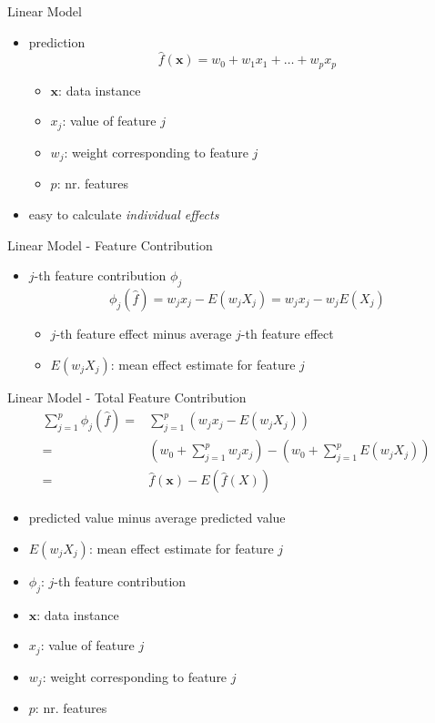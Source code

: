 \begin{frame}{Linear Model}
	\begin{itemize}
		\item prediction
		\begin{equation}
			\hat{f}(\bm{x})=w_0+w_1 x_{1} + \dots + w_p x_ p
		\end{equation}
		\begin{itemize}
			\item $\bm{x}$: data instance
			\item $x_j$: value of feature $j$
			\item $w_j$: weight corresponding to feature $j$
			\item $p$: nr. features
		\end{itemize}
		\item easy to calculate \emph{individual effects}
	\end{itemize}
\end{frame}
\begin{frame}{Linear Model - Feature Contribution}
	\begin{itemize}
		\item $j$-th feature contribution $\phi_j$
		\begin{equation}
			\phi_j(\hat{f})=w_{j}x_j-E(w_{j}X_{j})=w_{j}x_j-w_{j}E(X_{j})
		\end{equation}
		\begin{itemize}
			\item $j$-th feature effect minus average $j$-th feature effect
			\item $E(w_{j}X_{j})$: mean effect estimate for feature $j$
		\end{itemize}
	\end{itemize}
\end{frame}
\begin{frame}{Linear Model - Total Feature Contribution}
	\begin{align*}
		\sum_{j=1}^{p}\phi_j(\hat{f}) =&\sum_{j=1}^p(w_{j}x_j-E(w_{j}X_{j}))\\
		=&(w_0+\sum_{j=1}^pw_{j}x_j)-(w_0+\sum_{j=1}^{p}E(w_{j}X_{j}))\\
		=&\hat{f}(\bm{x})-E(\hat{f}(X))
	\end{align*}
	\begin{itemize}
		\item predicted value minus average predicted value
		\item $E(w_{j}X_{j})$: mean effect estimate for feature $j$
		\item $\phi_j$: $j$-th feature contribution
		\item $\bm{x}$: data instance
		\item $x_j$: value of feature $j$
		\item $w_j$: weight corresponding to feature $j$
		\item $p$: nr. features
	\end{itemize}
\end{frame}